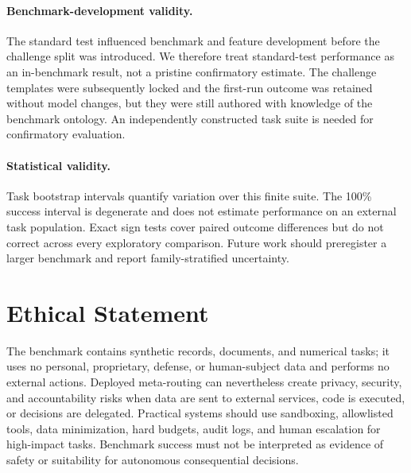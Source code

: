\documentclass[letterpaper]{article} %
\begin{document}
\paragraph{Benchmark-development validity.}
The standard test influenced benchmark and feature development before the challenge split was introduced. We therefore treat standard-test performance as an in-benchmark result, not a pristine confirmatory estimate. The challenge templates were subsequently locked and the first-run outcome was retained without model changes, but they were still authored with knowledge of the benchmark ontology. An independently constructed task suite is needed for confirmatory evaluation.

\paragraph{Statistical validity.}
Task bootstrap intervals quantify variation over this finite suite. The 100\% success interval is degenerate and does not estimate performance on an external task population. Exact sign tests cover paired outcome differences but do not correct across every exploratory comparison. Future work should preregister a larger benchmark and report family-stratified uncertainty.

\section*{Ethical Statement}

The benchmark contains synthetic records, documents, and numerical tasks; it uses no personal, proprietary, defense, or human-subject data and performs no external actions. Deployed meta-routing can nevertheless create privacy, security, and accountability risks when data are sent to external services, code is executed, or decisions are delegated. Practical systems should use sandboxing, allowlisted tools, data minimization, hard budgets, audit logs, and human escalation for high-impact tasks. Benchmark success must not be interpreted as evidence of safety or suitability for autonomous consequential decisions.



\end{document}
